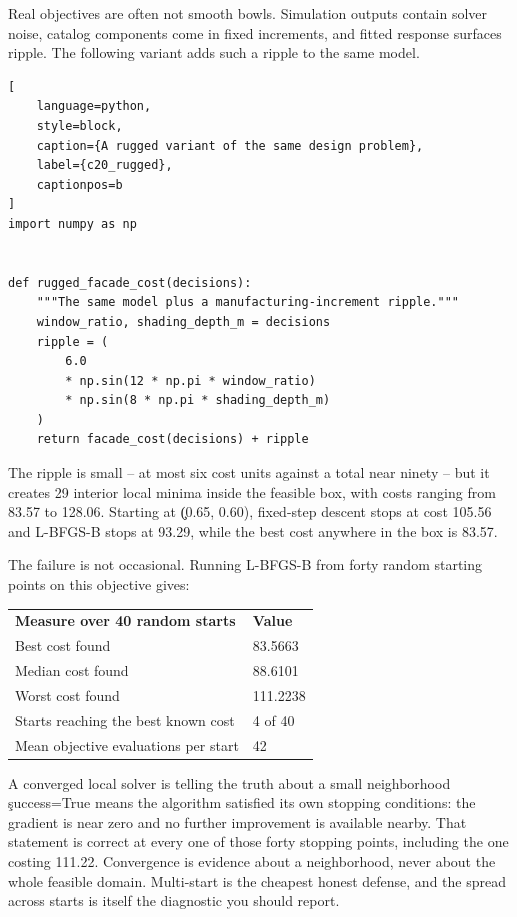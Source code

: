 Real objectives are often not smooth bowls. Simulation outputs contain solver
noise, catalog components come in fixed increments, and fitted response
surfaces ripple. The following variant adds such a ripple to the same model.

\begin{lstlisting}[
    language=python,
    style=block,
    caption={A rugged variant of the same design problem},
    label={c20_rugged},
    captionpos=b
]
import numpy as np


def rugged_facade_cost(decisions):
    """The same model plus a manufacturing-increment ripple."""
    window_ratio, shading_depth_m = decisions
    ripple = (
        6.0
        * np.sin(12 * np.pi * window_ratio)
        * np.sin(8 * np.pi * shading_depth_m)
    )
    return facade_cost(decisions) + ripple
\end{lstlisting}

The ripple is small -- at most six cost units against a total near ninety -- but
it creates 29 interior local minima inside the feasible box, with costs ranging
from 83.57 to 128.06. Starting at \c{(0.65, 0.60)}, fixed-step descent stops at
cost 105.56 and L-BFGS-B stops at 93.29, while the best cost anywhere in the box
is 83.57.

The failure is not occasional. Running L-BFGS-B from forty random starting
points on this objective gives:

\begin{center}
\begin{tabular}{ll}
\textbf{Measure over 40 random starts} & \textbf{Value} \\
Best cost found & 83.5663 \\
Median cost found & 88.6101 \\
Worst cost found & 111.2238 \\
Starts reaching the best known cost & 4 of 40 \\
Mean objective evaluations per start & 42 \\
\end{tabular}
\end{center}

\begin{ExplainBox}{A converged local solver is telling the truth about a small neighborhood}
\c{success=True} means the algorithm satisfied its own stopping conditions: the
gradient is near zero and no further improvement is available nearby. That
statement is correct at every one of those forty stopping points, including the
one costing 111.22. Convergence is evidence about a neighborhood, never about
the whole feasible domain. Multi-start is the cheapest honest defense, and the
spread across starts is itself the diagnostic you should report.
\end{ExplainBox}

